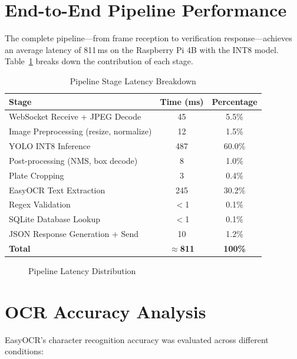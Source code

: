 \section{End-to-End Pipeline Performance}
The complete pipeline---from frame reception to verification response---achieves an average latency of 811\,ms on the Raspberry Pi 4B with the INT8 model. Table~\ref{tab:pipeline_breakdown} breaks down the contribution of each stage.

\begin{table}[H]
\centering
\caption{Pipeline Stage Latency Breakdown}
\label{tab:pipeline_breakdown}
\renewcommand{\arraystretch}{1.3}
\begin{tabular}{|l|c|c|}
\hline
\textbf{Stage} & \textbf{Time (ms)} & \textbf{Percentage} \\
\hline
WebSocket Receive + JPEG Decode & 45 & 5.5\% \\
\hline
Image Preprocessing (resize, normalize) & 12 & 1.5\% \\
\hline
YOLO INT8 Inference & 487 & 60.0\% \\
\hline
Post-processing (NMS, box decode) & 8 & 1.0\% \\
\hline
Plate Cropping & 3 & 0.4\% \\
\hline
EasyOCR Text Extraction & 245 & 30.2\% \\
\hline
Regex Validation & $<$1 & 0.1\% \\
\hline
SQLite Database Lookup & $<$1 & 0.1\% \\
\hline
JSON Response Generation + Send & 10 & 1.2\% \\
\hline
\textbf{Total} & \textbf{$\approx$811} & \textbf{100\%} \\
\hline
\end{tabular}
\end{table}

\begin{figure}[H]
\centering
{}
\caption{Pipeline Latency Distribution}
\label{fig:pie_latency}
\end{figure}

\section{OCR Accuracy Analysis}
EasyOCR's character recognition accuracy was evaluated across different conditions:

